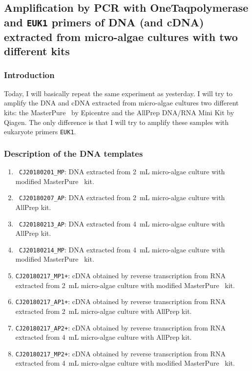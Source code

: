 \subsection{Amplification by PCR with OneTaq\cR polymerase and \texttt{EUK1} primers of DNA (and cDNA) extracted from micro-algae cultures with two different kits}
\label{task:20180218_cj0}

\subsubsection{Introduction}
Today, I will basically repeat the same experiment as yesterday. I will try to amplify the DNA and cDNA extracted from micro-algae cultures two different kits: the MasterPure\texttrademark~ by Epicentre and the AllPrep DNA/RNA Mini Kit by Qiagen. The only difference is that I will try to amplify these samples with eukaryote primers \texttt{EUK1}.


\subsubsection{Description of the DNA templates}
\begin{enumerate}
\item \texttt{{\color{Grass} CJ20180201\_MP}}: DNA extracted from 2~mL micro-algae culture with modified MasterPure\texttrademark~ kit.
\item \texttt{{\color{Aqua} CJ20180207\_AP}}: DNA extracted from 2~mL micro-algae culture with AllPrep kit.
\item \texttt{{\color{Lavender} CJ20180213\_AP}}: DNA extracted from 4~mL micro-algae culture with AllPrep kit.
\item \texttt{{\color{Sunflower} CJ20180214\_MP}}: DNA extracted from 4~mL micro-algae culture with modified MasterPure\texttrademark~ kit.
\item \texttt{CJ20180217\_MP1+}: cDNA obtained by reverse transcription  from RNA extracted from 2~mL micro-algae culture with modified MasterPure\texttrademark~ kit. 
\item \texttt{CJ20180217\_AP1+}: cDNA obtained by reverse transcription from RNA extracted from 2~mL micro-algae culture with AllPrep kit. 
\item \texttt{CJ20180217\_AP2+}: cDNA obtained by reverse transcription from RNA extracted from 4~mL micro-algae culture with AllPrep kit. 
\item \texttt{CJ20180217\_MP2+}: cDNA obtained by reverse transcription from RNA extracted from 4~mL micro-algae culture with modified MasterPure\texttrademark~ kit. 
\end{enumerate}

